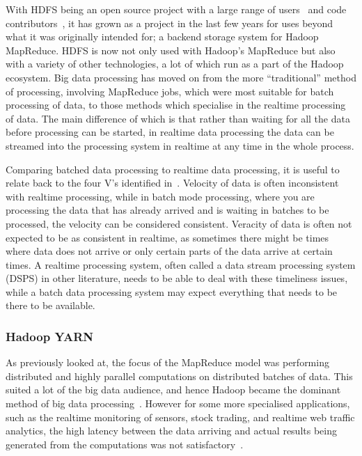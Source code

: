With HDFS being an open source project with a large range of users~\cite{hadoop_users} and code
contributors~\cite{hadoop_committers}, it has grown as a project in the last few years for uses beyond what it was
originally intended for; a backend storage system for Hadoop MapReduce. HDFS is now not only used with Hadoop's
MapReduce but also with a variety of other technologies, a lot of which run as a part of the Hadoop ecosystem.
Big data processing has moved on from the more ``traditional'' method of processing, involving MapReduce jobs, which
were most suitable for batch processing of data, to those methods which specialise in the realtime processing of data.
The main difference of which is that rather than waiting for all the data before processing can be started, in realtime
data processing the data can be streamed into the processing system in realtime at any time in the whole process.

Comparing batched data processing to realtime data processing, it is useful to relate back to the four V's
identified in~. Velocity of data is often inconsistent with realtime processing, while in batch mode
processing, where you are processing the data that has already arrived and is waiting in batches to be processed, the
velocity can be considered consistent. Veracity of data is often not expected to be as consistent in realtime, as
sometimes there might be times where data does not arrive or only certain parts of the data arrive at certain times.
A realtime processing system, often called a data stream processing system (DSPS) in other literature, needs to be able
to deal with these timeliness issues, while a batch data processing system may expect everything that needs to be there
to be available.

\subsubsection{Hadoop YARN} %
\label{ssub:apache_hadoop_yarn_}

As previously looked at, the focus of the MapReduce model was performing distributed and highly parallel computations
on distributed batches of data. This suited a lot of the big data audience, and hence Hadoop became the dominant
method of big data processing~\cite{liu_survey_2014}. However for some more specialised applications, such as
the realtime monitoring of sensors, stock trading, and realtime web traffic analytics, the high latency between the data
arriving and actual results being generated from the computations was not satisfactory~\cite{kamburugamuve_survey_2014}.

